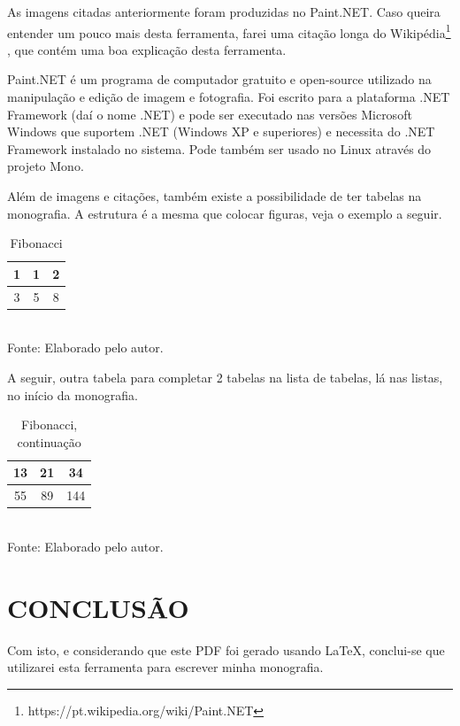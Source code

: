 \documentclass[12pt,a4paper]{article}
\newcommand{\source}[1]{Fonte: {#1}}
\begin{document}
	As imagens citadas anteriormente foram produzidas no Paint.NET.
	Caso queira entender um pouco mais desta ferramenta, farei uma citação longa do Wikipédia\footnote{https://pt.wikipedia.org/wiki/Paint.NET}
	, que contém uma boa explicação desta ferramenta.

\begin{longcitation}
	Paint.NET é um programa de computador gratuito e open-source utilizado na manipulação e edição de imagem e fotografia. Foi escrito para a plataforma .NET Framework (daí o nome .NET) e pode ser executado nas versões Microsoft Windows que suportem .NET (Windows XP e superiores) e necessita do .NET Framework instalado no sistema. Pode também ser usado no Linux através do projeto Mono.
\end{longcitation}
	
	Além de imagens e citações, também existe a possibilidade de ter tabelas na monografia.
	A estrutura é a mesma que colocar figuras, veja o exemplo a seguir.

\begin{table}[ht]
	\label{tabela1}
	\caption{Fibonacci}
	\centering
	\vspace{3mm}
	\begin{tabular}{|c|c|c|}
		\hline 
		1 & 1 & 2 \\ 
		\hline 
		3 & 5 & 8 \\ 
		\hline 
	\end{tabular} \\
	\vspace{3mm}
	\source{Elaborado pelo autor.}
\end{table}

	A seguir, outra tabela para completar 2 tabelas na lista de tabelas, lá nas listas, no início da monografia.

\begin{table}[ht]
	\label{tabela2}
	\caption{Fibonacci, continuação}
	\centering
	\vspace{3mm}
	\begin{tabular}{|c|c|c|}
		\hline 
		13 & 21 & 34 \\ 
		\hline 
		55 & 89 & 144 \\ 
		\hline 
	\end{tabular} \\
	\vspace{3mm}
	\source{Elaborado pelo autor.}
\end{table}

\clearpage %
\section{CONCLUSÃO}
	Com isto, e considerando que este PDF foi gerado usando \LaTeX , conclui-se que utilizarei esta ferramenta para escrever minha monografia.
\end{document}
